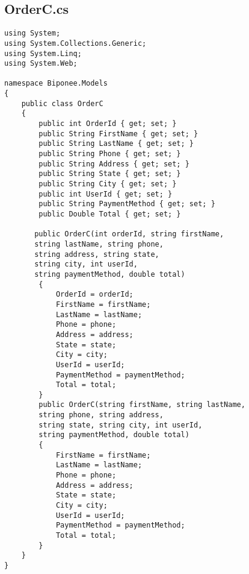 \subsection{OrderC.cs}
\begin{lstlisting}
using System;
using System.Collections.Generic;
using System.Linq;
using System.Web;

namespace Biponee.Models
{
    public class OrderC
    {
        public int OrderId { get; set; }
        public String FirstName { get; set; }
        public String LastName { get; set; }
        public String Phone { get; set; }
        public String Address { get; set; }
        public String State { get; set; }
        public String City { get; set; }
        public int UserId { get; set; }
        public String PaymentMethod { get; set; }
        public Double Total { get; set; }

       public OrderC(int orderId, string firstName,
       string lastName, string phone,
       string address, string state,
       string city, int userId,
       string paymentMethod, double total)
        {
            OrderId = orderId;
            FirstName = firstName;
            LastName = lastName;
            Phone = phone;
            Address = address;
            State = state;
            City = city;
            UserId = userId;
            PaymentMethod = paymentMethod;
            Total = total;
        }
        public OrderC(string firstName, string lastName,
        string phone, string address,
        string state, string city, int userId, 
        string paymentMethod, double total)
        {
            FirstName = firstName;
            LastName = lastName;
            Phone = phone;
            Address = address;
            State = state;
            City = city;
            UserId = userId;
            PaymentMethod = paymentMethod;
            Total = total;
        }
    }
}
\end{lstlisting}

\newpage


